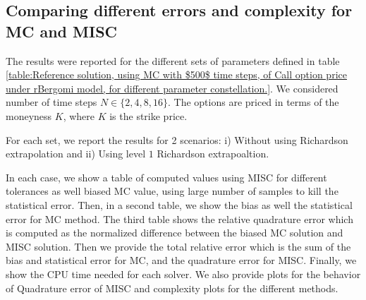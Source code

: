 \documentclass[11pt]{article}
\begin{document}
\subsection{Comparing different  errors and complexity for MC and MISC}\label{sec:Comparing different  errors and complexity for MC and MISC}


The results were reported for the different sets of parameters defined in table \ref{table:Reference solution, using MC with $500$ time steps, of Call option price under rBergomi model, for different parameter constellation.}. We considered   number of time steps $N \in \{2,4,8,16\}$.  The options are priced in terms of the moneyness $K$, where $K$ is the strike price.   

 For each set,  we report the results for 2 scenarios: i) Without using Richardson extrapolation and  ii) Using level $1$ Richardson extrapoaltion.

In each case, we show a table of computed values using MISC for different tolerances as well biased MC value, using large number of samples to kill the statistical error. Then, in a second table,  we show the bias as well the statistical error for MC method. The third table shows the relative quadrature error which is computed as the normalized difference between the biased MC solution and MISC solution. Then we provide the total relative error which is the sum of the bias and statistical error for MC, and the quadrature error for MISC. Finally, we show the CPU time needed for each solver. We also provide plots for the behavior of Quadrature error of MISC and complexity plots for the different methods. 






\end{document}
